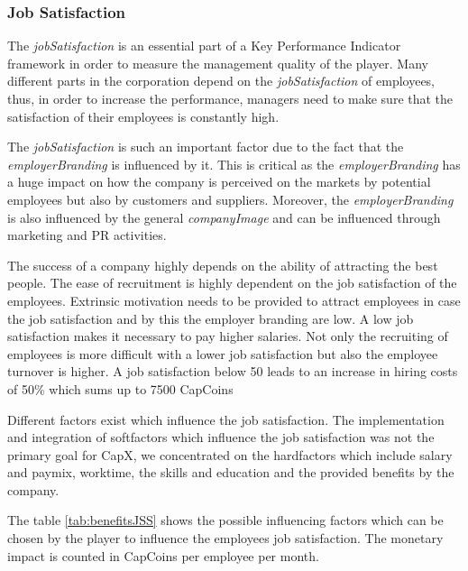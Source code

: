 \subsubsection{Job Satisfaction}
\label{subsub:jss}
The \textit{jobSatisfaction} is an essential part of a Key Performance Indicator framework in order to measure the management quality of the player. Many different parts in the corporation depend on the \textit{jobSatisfaction} of employees, thus, in order to increase the performance, managers need to make sure that the satisfaction of their employees is constantly high. \cite{KOYS}

The \textit{jobSatisfaction} is such an important factor due to the fact that the \textit{employerBranding} is influenced by it. This is critical as the \textit{employerBranding} has a huge impact on how the company is perceived on the markets by potential employees but also by customers and suppliers. Moreover, the \textit{employerBranding} is also influenced by the general \textit{companyImage} and can be influenced through marketing and PR activities. 

The success of a company highly depends on the ability of attracting the best people. The ease of recruitment is highly dependent on the job satisfaction of the employees. Extrinsic motivation needs to be provided to attract employees in case the job satisfaction and by this the employer branding are low. A low job satisfaction makes it necessary to pay higher salaries. Not only the recruiting of employees is more difficult with a lower job satisfaction but also the employee turnover is higher. A job satisfaction below 50 leads to an increase in hiring costs of 50\% which sums up to 7500 CapCoins \cite{frederiksen2016}

Different factors exist which influence the job satisfaction. \cite{Kapur} The implementation and integration of softfactors which influence the job satisfaction was not the primary goal for CapX, we concentrated on the hardfactors which include salary and paymix, worktime, the skills and education and the provided benefits by the company. 

The table \ref{tab:benefitsJSS} shows the possible influencing factors which can be chosen by the player to influence the employees job satisfaction. The monetary impact is counted in CapCoins per employee per month. 

